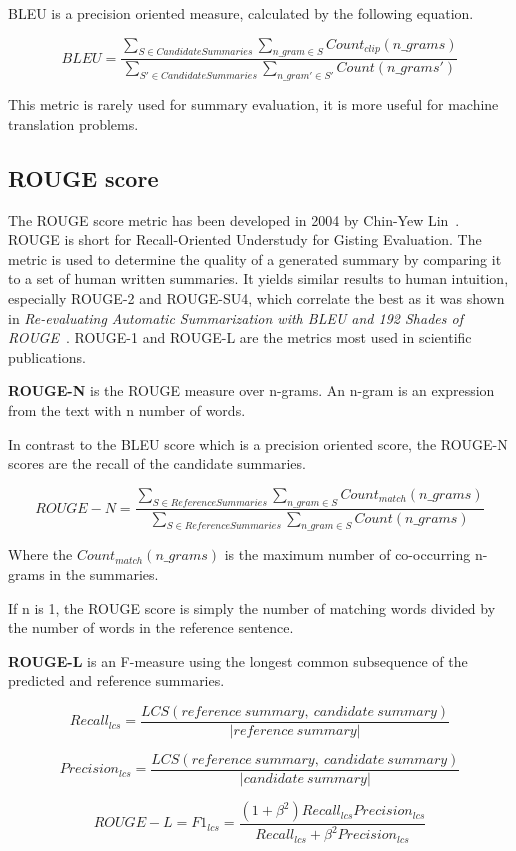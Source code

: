 BLEU is a precision oriented measure, calculated by the following equation.

\[BLEU = \frac{\sum_{S \in CandidateSummaries}\sum_{n\_gram \in S} Count_{clip} (n\_grams)}{\sum_{S' \in CandidateSummaries}\sum_{n\_gram' \in S'} Count(n\_grams')}\]

This metric is rarely used for summary evaluation, it is more useful for machine translation problems.

\subsection{ROUGE score}
The ROUGE score metric has been developed in 2004 by Chin-Yew Lin~\cite{ROUGE}. ROUGE is short for Recall-Oriented Understudy for Gisting Evaluation. The metric is used to determine the quality of a generated summary by comparing it to a set of human written summaries. It yields similar results to human intuition, especially ROUGE-2 and ROUGE-SU4, which correlate the best as it was shown in \textit{Re-evaluating Automatic Summarization with BLEU and 192 Shades of ROUGE}~\cite{ShadesOfROUGE}. ROUGE-1 and ROUGE-L are the metrics most used in scientific publications.

\textbf{ROUGE-N} is the ROUGE measure over n-grams. An n-gram is an expression from the text with n number of words.

In contrast to the BLEU score which is a precision oriented score, the ROUGE-N scores are the recall of the candidate summaries.

\[ROUGE-N = \frac{\sum_{S \in ReferenceSummaries}\sum_{n\_gram \in S} Count_{match} (n\_grams)}{\sum_{S \in ReferenceSummaries}\sum_{n\_gram \in S} Count(n\_grams)}\]

Where the \(Count_{match}(n\_grams)\) is the maximum number of co-occurring n-grams in the summaries.

If n is 1, the ROUGE score is simply the number of matching words divided by the number of words in the reference sentence.

\textbf{ROUGE-L} is an F-measure using the longest common subsequence of the predicted and reference summaries.

\[Recall_{lcs} = \frac{LCS(reference\ summary,\ candidate\ summary)}{|reference\ summary|}\]

\[Precision_{lcs} = \frac{LCS(reference\ summary,\ candidate\ summary)}{|candidate\ summary|}\]

\[ROUGE-L = F1_{lcs} = \frac{(1 + \beta^2)Recall_{lcs}Precision_{lcs}}{Recall_{lcs} + \beta^2Precision_{lcs}}\]

